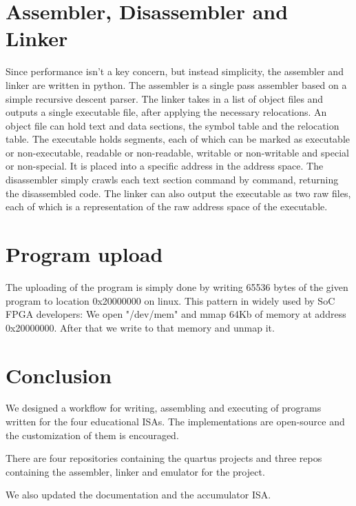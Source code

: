 \documentclass[conference]{IEEEtran}
\begin{document}
\section {Assembler, Disassembler and Linker \cite{b2}}
Since performance isn't a key concern, but instead simplicity, the assembler and
linker are written in python. The assembler is a single pass assembler based on
a simple recursive descent parser. The linker takes in a list of object files
and outputs a single executable file, after applying the necessary relocations.
An object file can hold text and data sections, the symbol table and the
relocation table. The executable holds segments, each of which can be marked as
executable or non-executable, readable or non-readable, writable or non-writable
and special or non-special. It is placed into a specific address in the address
space. The disassembler simply crawls each text section command by command,
returning the disassembled code. The linker can also output the executable as two
raw files, each of which is a representation of the raw address space of the
executable.

\section {Program upload}
The uploading of the program is simply done by writing 65536 bytes of the given program
to location 0x20000000 on linux. This pattern in widely used by SoC FPGA developers:
We open "/dev/mem" and mmap 64Kb of memory at address 0x20000000. After that we write to
that memory and unmap it.

\section {Conclusion}
We designed a workflow for writing, assembling and executing of programs written for the four educational ISAs.
The implementations are open-source and the customization of them is encouraged.

There are four repositories containing the quartus projects and three repos containing the assembler, linker and emulator for the
project.

We also updated the documentation and the accumulator ISA.
\end{document}
